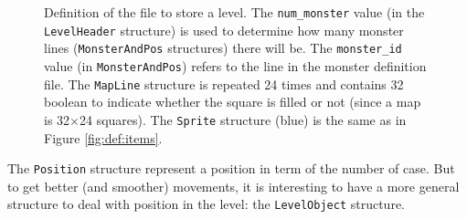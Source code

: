\documentclass[12pt,a4paper]{article}
\newcommand{\cc}[1]{\texttt{#1}}
\begin{document}
\begin{figure}
\caption{Definition of the file to store a level. The \texttt{num\_monster} value (in the \texttt{LevelHeader} structure) is used to determine how many monster lines (\texttt{MonsterAndPos} structures) there will be. The \texttt{monster\_id} value (in \texttt{MonsterAndPos}) refers to the line in the monster definition file. The \texttt{MapLine} structure is repeated 24 times and contains 32 boolean to indicate whether the square is filled or not (since a map is 32$\times$24 squares). The \texttt{Sprite} structure (blue) is the same as in Figure \ref{fig:def:items}.}
\label{fig:def:level}
\end{figure} 

The \cc{Position} structure represent a position in term of the number of case. But to get better (and smoother) movements, it is interesting to have a more general structure to deal with position in the level: the \cc{LevelObject} structure.
\end{document}
